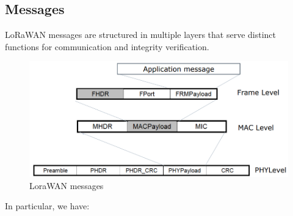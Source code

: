 \subsection{Messages}
LoRaWAN messages are structured in multiple layers that serve distinct functions for communication and integrity verification. 
\begin{figure}[H]
    \centering
    \includegraphics[width=0.5\linewidth]{images/lora1.png}
    \caption{LoraWAN messages}
\end{figure}
In particular, we have: 
